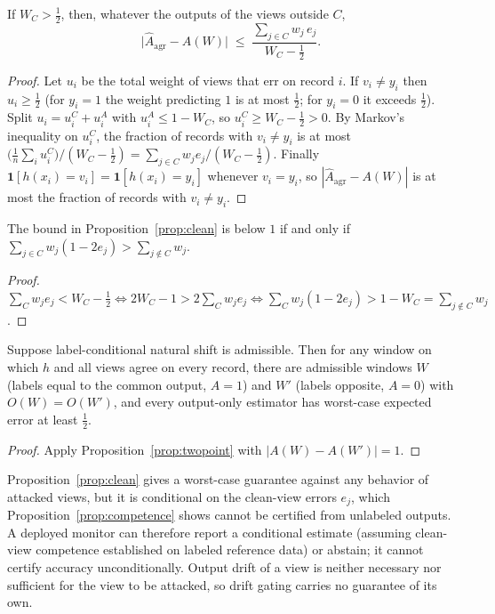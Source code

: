 \begin{proposition}\label{prop:clean}
If $W_C>\frac12$, then, whatever the outputs of the views outside $C$,
\[
\big|\hat A_{\mathrm{agr}}-A(W)\big|\;\le\;\frac{\sum_{j\in C}w_j\,e_j}{W_C-\frac12}.
\]
\end{proposition}
\begin{proof}
Let $u_i$ be the total weight of views that err on record $i$. If $v_i\neq y_i$ then $u_i\ge\frac12$ (for $y_i=1$ the weight predicting $1$ is at most $\frac12$; for $y_i=0$ it exceeds $\frac12$). Split $u_i=u_i^{C}+u_i^{A}$ with $u_i^{A}\le 1-W_C$, so $u_i^{C}\ge W_C-\frac12>0$. By Markov's inequality on $u_i^{C}$, the fraction of records with $v_i\ne y_i$ is at most $\big(\frac1n\sum_i u_i^{C}\big)/(W_C-\frac12)=\sum_{j\in C}w_je_j/(W_C-\frac12)$. Finally $\mathbf 1[h(x_i)=v_i]=\mathbf 1[h(x_i)=y_i]$ whenever $v_i=y_i$, so $|\hat A_{\mathrm{agr}}-A(W)|$ is at most the fraction of records with $v_i\ne y_i$.
\end{proof}

\begin{corollary}\label{cor:integrity}
The bound in Proposition~\ref{prop:clean} is below $1$ if and only if $\sum_{j\in C}w_j(1-2e_j)>\sum_{j\notin C}w_j$.
\end{corollary}
\begin{proof}
$\sum_{C}w_je_j<W_C-\frac12 \iff 2W_C-1>2\sum_C w_je_j \iff \sum_C w_j(1-2e_j)>1-W_C=\sum_{j\notin C}w_j$.
\end{proof}

\begin{proposition}\label{prop:competence}
Suppose label-conditional natural shift is admissible. Then for any window on which $h$ and all views agree on every record, there are admissible windows $W$ (labels equal to the common output, $A=1$) and $W'$ (labels opposite, $A=0$) with $O(W)=O(W')$, and every output-only estimator has worst-case expected error at least $\frac12$.
\end{proposition}
\begin{proof}
Apply Proposition~\ref{prop:twopoint} with $|A(W)-A(W')|=1$.
\end{proof}

\begin{remark}
Proposition~\ref{prop:clean} gives a worst-case guarantee against any behavior of attacked views, but it is conditional on the clean-view errors $e_j$, which Proposition~\ref{prop:competence} shows cannot be certified from unlabeled outputs. A deployed monitor can therefore report a conditional estimate (assuming clean-view competence established on labeled reference data) or abstain; it cannot certify accuracy unconditionally. Output drift of a view is neither necessary nor sufficient for the view to be attacked, so drift gating carries no guarantee of its own.
\end{remark}
